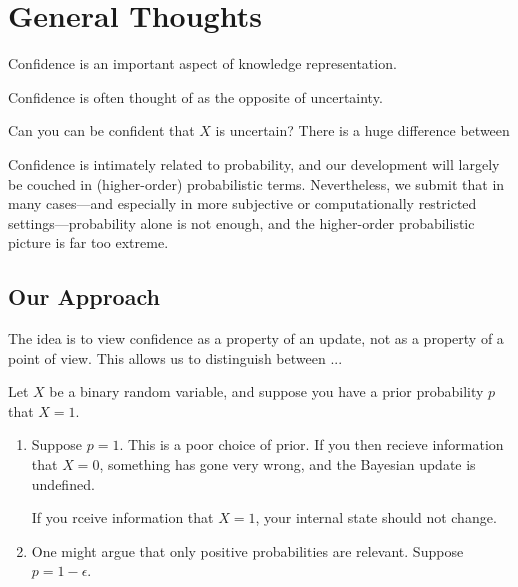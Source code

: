 \documentclass{article}
\begin{document}
    
    


    
\section{General Thoughts}
Confidence is an important aspect of knowledge representation.

Confidence is often thought of as the opposite of uncertainty.

Can you can be confident that $X$ is uncertain?
There is a huge difference between 



Confidence is intimately related to probability, and our development will largely be couched in (higher-order) probabilistic terms.
Nevertheless, we submit that in many cases---and especially in more subjective or computationally restricted settings---probability alone is not enough, and the higher-order probabilistic picture is far too extreme.


\subsection*{Our Approach}
The idea is to view confidence as a property of an update, not as a property of a point of view. 
This allows us to distinguish between ...

\begin{example}
Let $X$ be a binary random variable, and suppose you have a prior probability $p$ that $X=1$.
\begin{enumerate}
    \item Suppose $p=1$. 
    This is a poor choice of prior. 
    If you then recieve information that $X=0$, something has gone very wrong, and the Bayesian update is undefined.
    
    If you rceive information that $X = 1$, your internal state should not change. 
    
    \item One might argue that only positive probabilities are relevant.
    Suppose $p = 1 - \epsilon$.
\end{enumerate}
\end{example}
\end{document}
